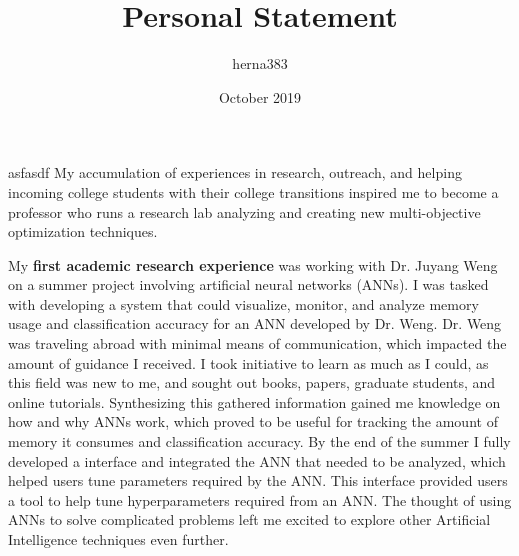 \documentclass[12pt]{report}
\title{Personal Statement}
\author{herna383}
\date{October 2019}
\begin{document}

asfasdf
My accumulation of experiences in research, outreach, and helping incoming college students with their college transitions inspired me to become a professor who runs a research lab analyzing and creating new multi-objective optimization techniques.

My \textbf{first academic research experience} was working with Dr. Juyang Weng on a summer project involving artificial neural networks (ANNs).
I was tasked with developing a system that could visualize, monitor, and analyze memory usage and classification accuracy for an ANN developed by Dr. Weng. 
Dr. Weng was traveling abroad with minimal means of communication, which impacted the amount of guidance I received.
I took initiative to learn as much as I could, as this field was new to me, and sought out books, papers, graduate students, and online tutorials.
Synthesizing this gathered information gained me knowledge on how and why ANNs work, which proved to be useful for tracking the amount of memory it consumes and classification accuracy.
By the end of the summer I fully developed a interface and integrated the ANN that needed to be analyzed, which helped users tune parameters required by the ANN.
This interface provided users a tool to help tune hyperparameters required from an ANN.  
The thought of using ANNs to solve complicated problems left me excited to explore other Artificial Intelligence techniques even further. 
\end{document}
